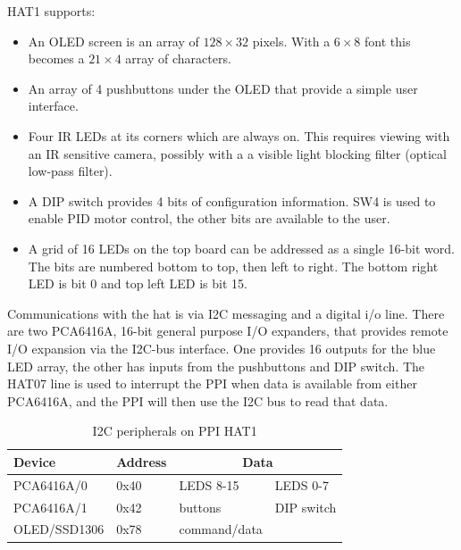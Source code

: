 \documentclass[11pt,fleqn]{article}
\begin{document}
HAT1 supports:
\begin{itemize}
\item An OLED screen is an array of $128\times 32$ pixels.  With a $6\times8$ font this becomes a $21\times4$ array of characters.

\item An array of 4 pushbuttons under the OLED that provide a simple user interface.

\item Four IR LEDs at its corners which are always on.  This requires viewing with an IR sensitive camera, possibly with a
a visible light blocking filter (optical low-pass filter).

\item A DIP switch provides 4 bits of configuration information.  SW4 is used to enable PID motor control, the other bits are available
to the user.

\item A grid of 16 LEDs on the top board can be addressed as a single 16-bit word. The bits are numbered bottom to top, then left to right. The bottom right LED is bit 0 and top left LED is bit 15.
\end{itemize}

Communications with the hat is via I2C messaging and a digital i/o line.  
There are two PCA6416A, 16-bit general purpose I/O expanders, that provides remote I/O expansion via the I2C-bus interface.
One provides 16 outputs for the blue LED array, the other has inputs from the pushbuttons and DIP switch.
The HAT07 line is used to interrupt the PPI when data is available from either PCA6416A, and the PPI will then use the I2C bus to read that data.


\begin{table}
\centering
\begin{tabular}{|l|l|l|l|} \hline
Device & Address & \multicolumn{2}{c|}{Data} \\ \hline\hline
PCA6416A/0 & 0x40 & LEDS 8-15 & LEDS 0-7 \\
PCA6416A/1 & 0x42 & buttons & DIP switch \\
OLED/SSD1306 & 0x78 & command/data & \\\hline
\end{tabular}
\caption{I2C peripherals on PPI HAT1}
\end{table}
\end{document}
